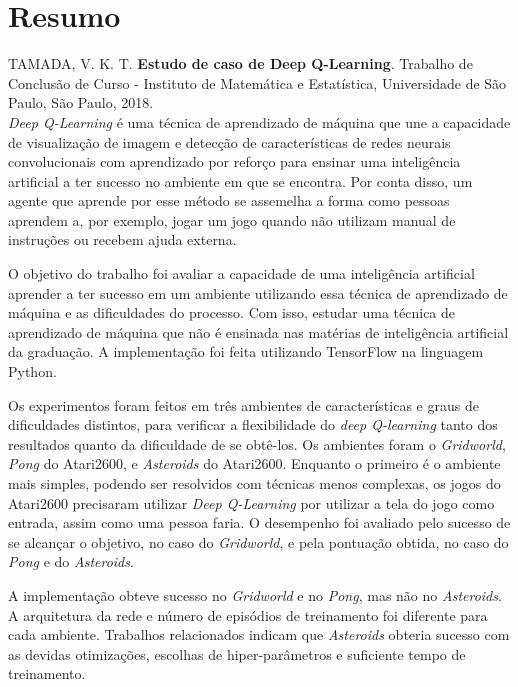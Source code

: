 \chapter*{Resumo}
%
\noindent%
TAMADA, V. K. T. \textbf{Estudo de caso de Deep Q-Learning}. Trabalho de Conclusão de Curso
 - Instituto de Matemática e Estatística, Universidade de São Paulo,
São Paulo, 2018.
\\

\textit{Deep Q-Learning} é uma técnica de aprendizado de máquina que une a capacidade de visualização de imagem e detecção de características de redes neurais convolucionais com aprendizado por reforço para ensinar uma inteligência artificial a ter sucesso no ambiente em que se encontra.
Por conta disso, um agente que aprende por esse método se assemelha a forma como pessoas aprendem a, por exemplo, jogar um jogo quando não utilizam manual de instruções ou recebem ajuda externa.

O objetivo do trabalho foi avaliar a capacidade de uma inteligência artificial aprender a ter sucesso em um ambiente utilizando essa técnica de aprendizado de máquina e as dificuldades do processo.
Com isso, estudar uma técnica de aprendizado de máquina que não é ensinada nas matérias de inteligência artificial da graduação.
A implementação foi feita utilizando TensorFlow na linguagem Python.

Os experimentos foram feitos em três ambientes de características e graus de dificuldades distintos, para verificar a flexibilidade do \textit{deep Q-learning} tanto dos resultados quanto da dificuldade de se obtê-los.
Os ambientes foram o \textit{Gridworld}, \textit{Pong} do Atari2600, e \textit{Asteroids} do Atari2600.
Enquanto o primeiro é o ambiente mais simples, podendo ser resolvidos com técnicas menos complexas, os jogos do Atari2600 precisaram utilizar \textit{Deep Q-Learning} por utilizar a tela do jogo como entrada, assim como uma pessoa faria.
O desempenho foi avaliado pelo sucesso de se alcançar o objetivo, no caso do \textit{Gridworld}, e pela pontuação obtida, no caso do \textit{Pong} e do \textit{Asteroids}.

A implementação obteve sucesso no \textit{Gridworld} e no \textit{Pong}, mas não no \textit{Asteroids}.
A arquitetura da rede e número de episódios de treinamento foi diferente para cada ambiente.
Trabalhos relacionados indicam que \textit{Asteroids} obteria sucesso com as devidas otimizações, escolhas de hiper-parâmetros e suficiente tempo de treinamento.

